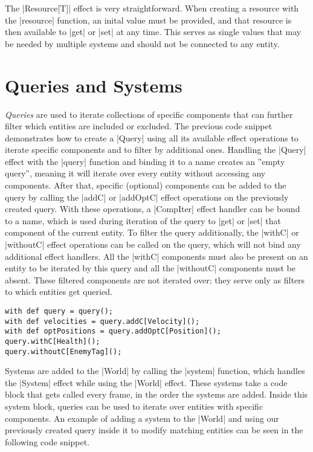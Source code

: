The |Resource[T]| effect is very straightforward. When creating a resource with the |resource| function, an inital value must be provided, and that resource is then available to |get| or |set| at any time. This serves as single values that may be needed by multiple systems and should not be connected to any entity.

\section{Queries and Systems}\label{sec:queries}

\textit{Queries} are used to iterate collections of specific components that can further filter which entities are included or excluded. The previous code snippet demonstrates how to create a |Query| using all its available effect operations to iterate specific components and to filter by additional ones. Handling the |Query| effect with the |query| function and binding it to a name creates an ''empty query'', meaning it will iterate over every entity without accessing any components. After that, specific (optional) components can be added to the query by calling the |addC| or |addOptC| effect operations on the previously created query. With these operations, a |CompIter| effect handler can be bound to a name, which is used during iteration of the query to |get| or |set| that component of the current entity. To filter the query additionally, the |withC| or |withoutC| effect operations can be called on the query, which will not bind any additional effect handlers. All the |withC| components must also be present on an entity to be iterated by this query and all the |withoutC| components must be absent. These filtered components are not iterated over; they serve only as filters to which entities get queried.

\begin{lstlisting}
with def query = query();
with def velocities = query.addC[Velocity]();
with def optPositions = query.addOptC[Position]();
query.withC[Health]();
query.withoutC[EnemyTag]();
\end{lstlisting}

Systems are added to the |World| by calling the |system| function, which handles the |System| effect while using the |World| effect. These systems take a code block that gets called every frame, in the order the systems are added. Inside this system block, queries can be used to iterate over entities with specific components. An example of adding a system to the |World| and using our previously created query inside it to modify matching entities can be seen in the following code snippet.

